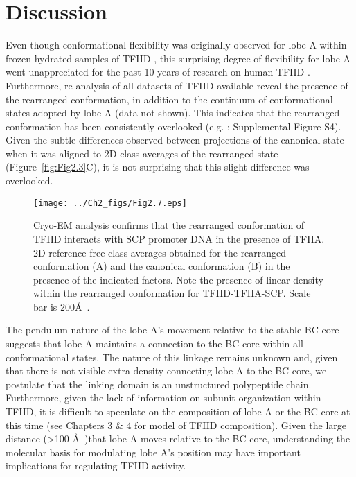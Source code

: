 \section{Discussion}
Even though conformational flexibility was originally observed for lobe A within frozen-hydrated samples of TFIID \cite{Grob_1281}, this surprising degree of flexibility for lobe A went unappreciated for the past 10 years of research on human TFIID \cite{Andel_2407,Grob_1281,Liu_723,Liu_574}. Furthermore, re-analysis of all datasets of TFIID available reveal the presence of the rearranged conformation, in addition to the continuum of conformational states adopted by lobe A (data not shown). This indicates that the rearranged conformation has been consistently overlooked (e.g. \cite{Liu_723}: Supplemental Figure S4). Given the subtle differences observed between projections of the canonical state when it was aligned to 2D class averages of the rearranged state (Figure~\ref{fig:Fig2.3}C), it is not surprising that this slight difference was overlooked.\\
\begin{figure}
\centering
\texttt{[image: ../Ch2\_figs/Fig2.7.eps]}
\caption[Cryo-EM analysis confirms that the rearranged conformation of TFIID interacts with SCP promoter DNA in the presence of TFIIA]{Cryo-EM analysis confirms that the rearranged conformation of TFIID interacts with SCP promoter DNA in the presence of TFIIA. 2D reference-free class averages obtained for the rearranged conformation (A) and the canonical conformation (B) in the presence of the indicated factors.  Note the presence of linear density within the rearranged conformation for TFIID-TFIIA-SCP.  Scale bar is 200\AA\ .}
\label{fig:Fig2.7}
\end{figure}
\indent The pendulum nature of the lobe A's movement relative to the stable BC core suggests that lobe A maintains a connection to the BC core within all conformational states. The nature of this linkage remains unknown and, given that there is not visible extra density connecting lobe A to the BC core, we postulate that the linking domain is an unstructured polypeptide chain. Furthermore, given the lack of information on subunit organization within TFIID, it is difficult to speculate on the composition of lobe A or the BC core at this time (see Chapters 3 \& 4 for model of TFIID composition). Given the large distance (\textgreater 100 \AA\ )that lobe A moves relative to the BC core, understanding the molecular basis for modulating lobe A's position may have important implications for regulating TFIID activity.   \\ 
